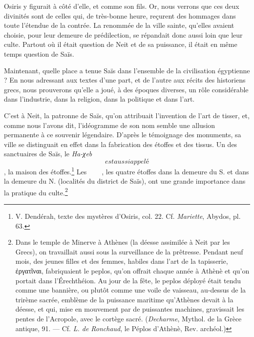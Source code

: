 \documentclass[a4paper, 11pt, oneside]{article}
\newcommand*\hieroAAAU{}
\newcommand*\hieroAAAX{}
\newcommand*\hieroAADR{}
\newcommand*\hieroAADV{\raisebox{0.5ex}{}}
\newcommand*\hieroAAFW{}
\newcommand*\hieroAAFX{}
\newcommand*\hieroAAFY{}
\newcommand*\hieroAAFZ{\raisebox{0.5ex}{}}
\newcommand*\hieroAAGA{}
\newcommand*\hieroAAGB{}
\begin{document}
Osiris y figurait à côté d'elle, et comme son fils. Or, nous verrons que ces deux divinités sont de celles qui, de très-bonne heure, reçurent des hommages dans toute l'étendue de la contrée. La renommée de la ville sainte, qu'elles avaient choisie, pour leur demeure de prédilection, se répandait donc aussi loin que leur culte. Partout où il était question de Neit et de sa puissance, il était en même temps question de Saïs.

Maintenant, quelle place a tenue Saïs dans l'ensemble de la civilisation égyptienne ? En nous adressant aux textes d'une part, et de l'autre aux récits des historiens grecs, nous prouverons qu'elle a joué, à des époques diverses, un rôle considérable dans l'industrie, dans la religion, dans la politique et dans l'art.

C'est à Neit, la patronne de Saïs, qu'on attribuait l'invention de l'art de tisser, et, comme nous l'avons dit, l'idéogramme de son nom semble une allusion permanente à ce souvenir légendaire. D'après le témoignage des monuments, sa ville se distinguait en effet dans la fabrication des étoffes et des tissus. Un des sanctuaires de Saïs, le \emph{Ha-χeb} $\hieroAAFW$ est aussi appelé $\hieroAAFX$, la maison des étoffes.\footnote{V. Dendérah, texte des mystères d'Osiris, col. 22. Cf. \emph{Mariette}, Abydos, pl. 63.} Les $\hieroAAFY\:\hieroAAFZ\:\hieroAAGA\allowbreak\:\hieroAADV\:\hieroAAAX\:\hieroAADR\allowbreak\:\hieroAAAU\:\hieroAAGB\:\hieroAAAU$, les quatre étoffes dans la demeure du S. et dans la demeure du N. (localités du district de Saïs), ont une grande importance dans la pratique du culte.\footnote{Dans le temple de Minerve à Athènes (la déesse assimilée à Neit par les Grecs), on travaillait aussi sous la surveillance de la prêtresse. Pendant neuf mois, des jeunes filles et des femmes, habiles dans l'art de la tapisserie, ἐργατῖναι, fabriquaient le peplos, qu'on offrait chaque année à Athènè et qu'on portait dans l'Érechthéion. Au jour de la fête, le peplos déployé était tendu comme une bannière, ou plutôt comme une voile de vaisseau, au-dessus de la trirème sacrée, emblème de la puissance maritime qu'Athènes devait à la déesse, et qui, mise en mouvement par de puissantes machines, gravissait les pentes de l'Acropole, avec le cortège sacré. (\emph{Decharme}, Mythol. de la Grèce antique, 91. --- Cf. \emph{L. de Ronchaud}, le Péplos d'Athènè, Rev. archéol.)}
\end{document}
